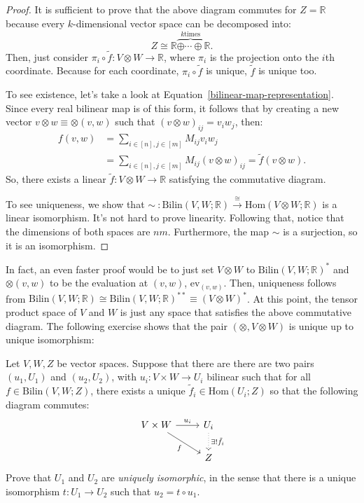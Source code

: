 \begin{proof}
It is sufficient to prove that the above diagram commutes for $Z =
\mathbb{R}$ because every $k$-dimensional vector space can be
decomposed into: 
\[Z \cong \mathbb{R} \overbrace{\oplus \dotsm \oplus}^{k \textrm{
    times}} \mathbb{R}.\] 
Then, just consider $\pi_i \circ \tilde{f} : V \otimes W \to
\mathbb{R}$, where $\pi_i$ is the projection onto the $i$th
coordinate. Because for each coordinate, $\pi_i \circ \tilde{f}$ is
unique, $\tilde{f}$ is unique too. 

To see existence, let's take a look at
Equation~\ref{bilinear-map-representation}. Since every real bilinear 
map is of this form, it follows that by creating a new vector
$v\otimes w \equiv \otimes (v,w) $ such that $(v \otimes w)_{ij} =
v_iw_j$, then: 
\begin{align*}
f(v,w) &= \sum_{i\in[n], j\in [m]} M_{ij} v_iw_j \\
&= \sum_{i\in[n], j\in [m]} M_{ij} (v \otimes w)_{ij} = \tilde{f}(v \otimes w).
\end{align*}
So, there exists a linear $\tilde{f} : V \otimes W \to \mathbb{R}$
satisfying the commutative diagram. 

To see uniqueness, we show that $\sim \ : \mathrm{Bilin}(V,W;
\mathbb{R}) \overset{\cong}{\longrightarrow} \mathrm{Hom}(V \otimes W;
\mathbb{R})$ is a linear isomorphism. It's not hard to prove
linearity. Following that, notice that the dimensions of both spaces
are $n m$. Furthermore, the map $\sim$ is a surjection, so it is an
isomorphism. 
\end{proof}

In fact, an even faster proof would be to just set $V \otimes W$ to
$\mathrm{Bilin}(V,W;\mathbb{R})^*$ and $\otimes (v,w)$ to be the
evaluation at $(v,w)$, $\mathrm{ev}_{(v,w)}$. Then, uniqueness follows
from $\mathrm{Bilin}(V,W;\mathbb{R}) \cong
\mathrm{Bilin}(V,W;\mathbb{R})^{**} \equiv (V \otimes W)^*$. At this
point, the tensor product space of $V$ and $W$ is just any space that
satisfies the above commutative diagram. The following exercise shows
that the pair $(\otimes, V \otimes W)$ is unique up to unique
isomorphism: 

\begin{exercise}
  Let $V,W,Z$ be vector spaces. Suppose that there are there are two
  pairs $(u_1,U_1)$ and $(u_2,U_2)$, with $u_i : V \times W \to U_i$
  bilinear such that for all $f \in \mathrm{Bilin}(V,W;Z)$, there
  exists a unique $\tilde{f}_i \in \mathrm{Hom}(U_i; Z)$ so that the
  following diagram commutes: 
  \[\begin{tikzcd}
V \times W \arrow{r}{u_i} \arrow[swap]{dr}{f} & U_i
\arrow[dotted]{d}{\exists !\tilde{f}_i} \\ 
& Z
  \end{tikzcd}\]
  Prove that $U_1$ and $U_2$ are \emph{uniquely isomorphic}, in the
  sense that there is a unique isomorphism $t: U_1 \to U_2$ such that
  $u_2 = t \circ u_1$.  
\end{exercise}

